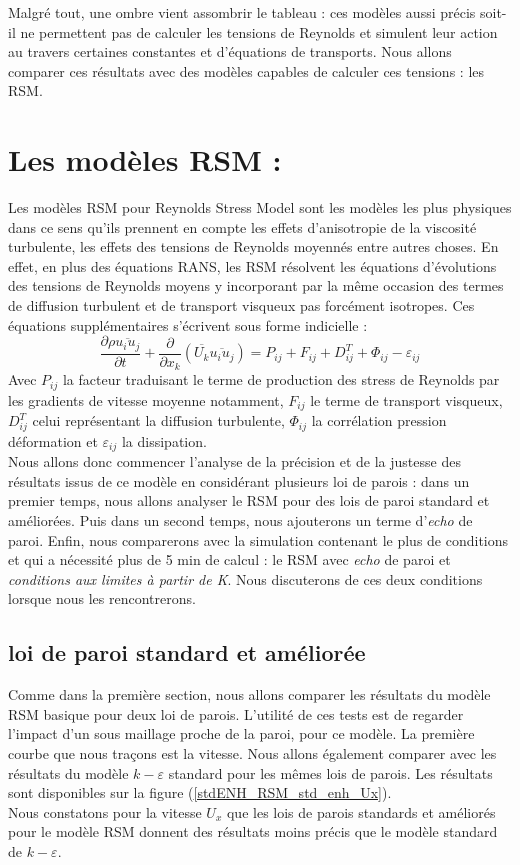 \documentclass[a4paper,10pt]{article}
\newcommand{\keps}{$k-\varepsilon$}
\newcommand{\npurple}{\color{forest}}
\newcommand{\brik}{\color{brick}}
\newcommand\black{\color{black}}
\begin{document}
Malgré tout, une ombre vient assombrir le tableau : ces modèles aussi précis soit-il ne permettent pas de calculer les tensions de Reynolds et simulent leur action au travers certaines constantes et d'équations de transports. Nous allons comparer ces résultats avec des modèles capables de calculer ces tensions : les RSM.
\brik
  \section{Les modèles RSM :} \black
  Les modèles RSM pour Reynolds Stress Model sont les modèles les plus physiques dans ce sens qu'ils prennent en compte les effets d'anisotropie de la viscosité turbulente, les effets des tensions de Reynolds moyennés entre autres choses. En effet, en plus des équations RANS, les RSM résolvent les équations d'évolutions des tensions de Reynolds moyens y incorporant par la même occasion des termes de diffusion turbulent et de transport visqueux pas forcément isotropes. Ces équations supplémentaires s'écrivent sous forme indicielle : 
  \begin{equation}
  \frac{\partial \rho \overline{u_i u_j}}{\partial t} + \frac{\partial }{\partial x_k} \left( \overline{U_k} \overline{u_i u_j}\right) = P_{ij} + F_{ij} + D^T_{ij} + \Phi _{ij} - \varepsilon _{ij}
  \end{equation}
Avec $P_{ij}$ la facteur traduisant le terme de production des stress de Reynolds par les gradients de vitesse moyenne notamment, $F_{ij}$ le terme de transport visqueux, $D^T_{ij}$ celui représentant la diffusion turbulente, $\Phi_{ij}$ la corrélation pression déformation et $\varepsilon_{ij}$ la dissipation. \\
Nous allons donc commencer l'analyse de la précision et de la justesse des résultats issus de ce modèle en considérant plusieurs loi de parois : dans un premier temps, nous allons analyser le RSM pour des lois de paroi standard et améliorées. Puis dans un second temps, nous ajouterons un terme d'\textit{echo} de paroi. Enfin, nous comparerons avec la simulation contenant le plus de conditions et qui a nécessité plus de 5 min de calcul : le RSM avec \textit{echo} de paroi et \textit{conditions aux limites à partir de K}. Nous discuterons de ces deux conditions lorsque nous les rencontrerons.

\npurple
\subsection{loi de paroi standard et améliorée} \black
Comme dans la première section, nous allons comparer les résultats du modèle RSM basique pour deux loi de parois. L'utilité de ces tests est de regarder l'impact d'un sous maillage proche de la paroi, pour ce modèle. La première courbe que nous traçons est la vitesse. Nous allons également comparer avec les résultats du modèle \keps $ $ standard pour les mêmes lois de parois. Les résultats sont disponibles sur la figure (\ref{stdENH_RSM_std_enh_Ux}).  \\
Nous constatons pour la vitesse $U_x$ que les lois de parois standards et améliorés pour le modèle RSM donnent des résultats moins précis que le modèle standard de \keps. \\
\end{document}
